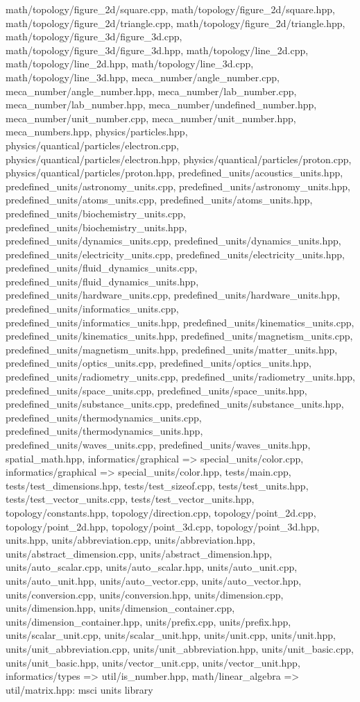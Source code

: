 \begin{DoxyVerb}
math/topology/figure_2d/square.cpp,
math/topology/figure_2d/square.hpp,
math/topology/figure_2d/triangle.cpp,
math/topology/figure_2d/triangle.hpp,
math/topology/figure_3d/figure_3d.cpp,
math/topology/figure_3d/figure_3d.hpp, math/topology/line_2d.cpp,
math/topology/line_2d.hpp, math/topology/line_3d.cpp,
math/topology/line_3d.hpp, meca_number/angle_number.cpp,
meca_number/angle_number.hpp, meca_number/lab_number.cpp,
meca_number/lab_number.hpp, meca_number/undefined_number.hpp,
meca_number/unit_number.cpp, meca_number/unit_number.hpp,
meca_numbers.hpp, physics/particles.hpp,
physics/quantical/particles/electron.cpp,
physics/quantical/particles/electron.hpp,
physics/quantical/particles/proton.cpp,
physics/quantical/particles/proton.hpp,
predefined_units/acoustics_units.hpp,
predefined_units/astronomy_units.cpp,
predefined_units/astronomy_units.hpp,
predefined_units/atoms_units.cpp, predefined_units/atoms_units.hpp,
predefined_units/biochemistry_units.cpp,
predefined_units/biochemistry_units.hpp,
predefined_units/dynamics_units.cpp,
predefined_units/dynamics_units.hpp,
predefined_units/electricity_units.cpp,
predefined_units/electricity_units.hpp,
predefined_units/fluid_dynamics_units.cpp,
predefined_units/fluid_dynamics_units.hpp,
predefined_units/hardware_units.cpp,
predefined_units/hardware_units.hpp,
predefined_units/informatics_units.cpp,
predefined_units/informatics_units.hpp,
predefined_units/kinematics_units.cpp,
predefined_units/kinematics_units.hpp,
predefined_units/magnetism_units.cpp,
predefined_units/magnetism_units.hpp,
predefined_units/matter_units.hpp,
predefined_units/optics_units.cpp,
predefined_units/optics_units.hpp,
predefined_units/radiometry_units.cpp,
predefined_units/radiometry_units.hpp,
predefined_units/space_units.cpp, predefined_units/space_units.hpp,
predefined_units/substance_units.cpp,
predefined_units/substance_units.hpp,
predefined_units/thermodynamics_units.cpp,
predefined_units/thermodynamics_units.hpp,
predefined_units/waves_units.cpp, predefined_units/waves_units.hpp,
spatial_math.hpp, {informatics/graphical =>
special_units}/color.cpp, {informatics/graphical =>
special_units}/color.hpp, tests/main.cpp,
tests/test_dimensions.hpp, tests/test_sizeof.cpp,
tests/test_units.hpp, tests/test_vector_units.cpp,
tests/test_vector_units.hpp, topology/constants.hpp,
topology/direction.cpp, topology/point_2d.cpp,
topology/point_2d.hpp, topology/point_3d.cpp,
topology/point_3d.hpp, units.hpp, units/abbreviation.cpp,
units/abbreviation.hpp, units/abstract_dimension.cpp,
units/abstract_dimension.hpp, units/auto_scalar.cpp,
units/auto_scalar.hpp, units/auto_unit.cpp, units/auto_unit.hpp,
units/auto_vector.cpp, units/auto_vector.hpp, units/conversion.cpp,
units/conversion.hpp, units/dimension.cpp, units/dimension.hpp,
units/dimension_container.cpp, units/dimension_container.hpp,
units/prefix.cpp, units/prefix.hpp, units/scalar_unit.cpp,
units/scalar_unit.hpp, units/unit.cpp, units/unit.hpp,
units/unit_abbreviation.cpp, units/unit_abbreviation.hpp,
units/unit_basic.cpp, units/unit_basic.hpp, units/vector_unit.cpp,
units/vector_unit.hpp, {informatics/types => util}/is_number.hpp,
{math/linear_algebra => util}/matrix.hpp: msci units library
\end{DoxyVerb}
